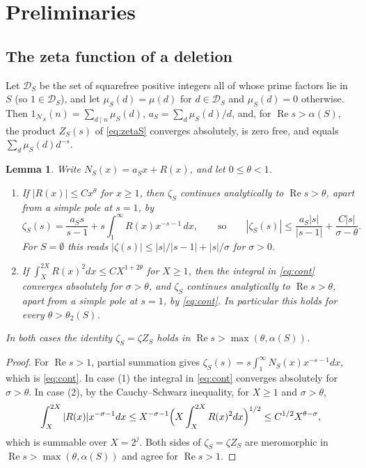 \documentclass[11pt]{amsart}
\newtheorem{lemma}{Lemma}[section]
\theoremstyle{remark}
\numberwithin{equation}{section}
\newcommand{\cD}{\mathcal{D}}
\newcommand{\cN}{\mathcal{N}}
\DeclareMathOperator{\re}{Re}
\begin{document}
\section{Preliminaries}\label{sec:prelim}

\subsection{The zeta function of a deletion}
Let $\cD_S$ be the set of squarefree positive integers all of whose prime factors lie in $S$ (so $1\in\cD_S$), and let $\mu_S(d)=\mu(d)$ for $d\in\cD_S$ and $\mu_S(d)=0$ otherwise. Then $1_{\cN_S}(n)=\sum_{d\mid n}\mu_S(d)$, $a_S=\sum_d\mu_S(d)/d$, and, for $\re s>\alpha(S)$, the product $Z_S(s)$ of \eqref{eq:zetaS} converges absolutely, is zero free, and equals $\sum_{d}\mu_S(d)d^{-s}$.

\begin{lemma}\label{lem:cont}
Write $N_S(x)=a_Sx+R(x)$, and let $0\le\theta<1$.
\begin{enumerate}
\item If $|R(x)|\le Cx^{\theta}$ for $x\ge1$, then $\zeta_S$ continues analytically to $\re s>\theta$, apart from a simple pole at $s=1$, by
\begin{equation}\label{eq:cont}
\zeta_S(s)=\frac{a_Ss}{s-1}+s\int_1^\infty R(x)x^{-s-1}\,dx ,\qquad\text{so}\qquad |\zeta_S(s)|\le\frac{a_S|s|}{|s-1|}+\frac{C|s|}{\sigma-\theta}.
\end{equation}
For $S=\emptyset$ this reads $|\zeta(s)|\le|s|/|s-1|+|s|/\sigma$ for $\sigma>0$.
\item If $\int_X^{2X}R(x)^2dx\le CX^{1+2\theta}$ for $X\ge1$, then the integral in \eqref{eq:cont} converges absolutely for $\sigma>\theta$, and $\zeta_S$ continues analytically to $\re s>\theta$, apart from a simple pole at $s=1$, by \eqref{eq:cont}. In particular this holds for every $\theta>\theta_2(S)$.
\end{enumerate}
In both cases the identity $\zeta_S=\zeta Z_S$ holds in $\re s>\max(\theta,\alpha(S))$.
\end{lemma}

\begin{proof}
For $\re s>1$, partial summation gives $\zeta_S(s)=s\int_1^\infty N_S(x)x^{-s-1}dx$, which is \eqref{eq:cont}. In case (1) the integral in \eqref{eq:cont} converges absolutely for $\sigma>\theta$. In case (2), by the Cauchy--Schwarz inequality, for $X\ge1$ and $\sigma>\theta$,
\[
\int_X^{2X}|R(x)|x^{-\sigma-1}dx\le X^{-\sigma-1}\Bigl(X\int_X^{2X}R(x)^2dx\Bigr)^{1/2}\le C^{1/2}X^{\theta-\sigma},
\]
which is summable over $X=2^j$. Both sides of $\zeta_S=\zeta Z_S$ are meromorphic in $\re s>\max(\theta,\alpha(S))$ and agree for $\re s>1$.
\end{proof}
\end{document}
